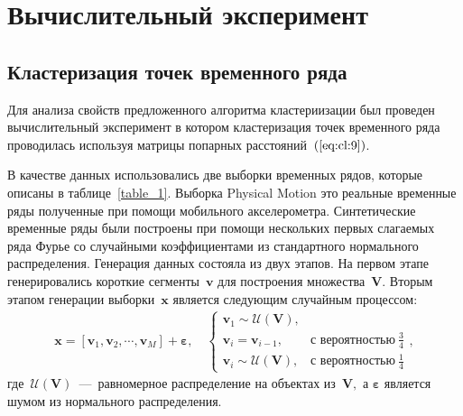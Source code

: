 \documentclass[12pt, twoside]{article}
\numberwithin{equation}{section}
\begin{document}


\section{Вычислительный эксперимент}
\subsection{Кластеризация точек временного ряда}
Для анализа свойств предложенного алгоритма кластериизации был проведен вычислительный эксперимент в котором кластеризация точек временного ряда проводилась используя матрицы попарных расстояний~$(\ref{eq:cl:9})$.

В качестве данных использовались две выборки временных рядов, которые описаны в таблице~\ref{table_1}. 
Выборка Physical Motion это реальные временные ряды полученные при помощи мобильного акселерометра. 
Синтетические временные ряды были построены при помощи нескольких первых слагаемых ряда Фурье со случайными коэффициентами из стандартного нормального распределения. 
Генерация данных состояла из двух этапов. 
На первом этапе генерировались короткие сегменты~$\textbf{v}$ для построения множества~$\mathbf{V}$. 
Вторым этапом генерации выборки~$\textbf{x}$ является следующим случайным процессом:
\begin{equation}
\label{eq:exp:1}
\begin{aligned}
\textbf{x} = [\textbf{v}_{1}, \textbf{v}_{2}, \cdots, \textbf{v}_{M}] + \bm{\varepsilon}, \quad \begin{cases}
    \textbf{v}_{1} \sim \mathcal{U}\left(\mathbf{V}\right),\\
    \textbf{v}_{i} = \textbf{v}_{i - 1}, & \text{с вероятностью}~\frac{3}{4}\\
    \textbf{v}_{i} \sim \mathcal{U}\left(\mathbf{V}\right), & \text{с вероятностью}~\frac{1}{4}
\end{cases},
\end{aligned}
\end{equation}
где~$\mathcal{U}\left(\mathbf{V}\right)$~---~равномерное распределение на объектах из~$\mathbf{V},$ а $\bm{\varepsilon}$ является шумом из нормального распределения.
\end{document}
